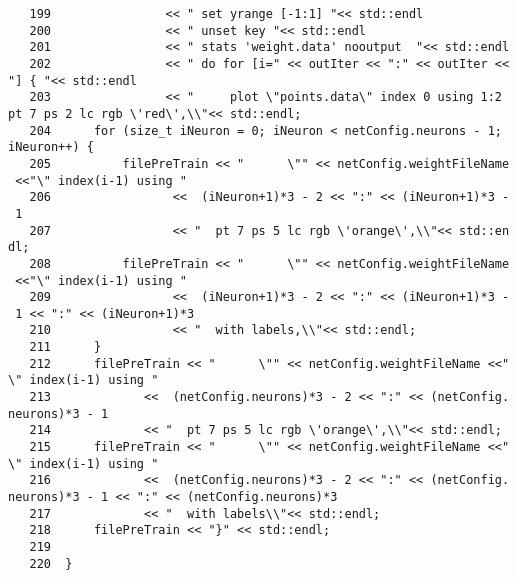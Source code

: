 \begin{verbatim}
   199                << " set yrange [-1:1] "<< std::endl
   200                << " unset key "<< std::endl              
   201                << " stats 'weight.data' nooutput  "<< std::endl
   202                << " do for [i=" << outIter << ":" << outIter <<
"] { "<< std::endl
   203                << "     plot \"points.data\" index 0 using 1:2 
pt 7 ps 2 lc rgb \'red\',\\"<< std::endl;
   204      for (size_t iNeuron = 0; iNeuron < netConfig.neurons - 1; 
iNeuron++) {
   205          filePreTrain << "      \"" << netConfig.weightFileName
 <<"\" index(i-1) using " 
   206                 <<  (iNeuron+1)*3 - 2 << ":" << (iNeuron+1)*3 -
 1
   207                 << "  pt 7 ps 5 lc rgb \'orange\',\\"<< std::en
dl;
   208          filePreTrain << "      \"" << netConfig.weightFileName
 <<"\" index(i-1) using " 
   209                 <<  (iNeuron+1)*3 - 2 << ":" << (iNeuron+1)*3 -
 1 << ":" << (iNeuron+1)*3
   210                 << "  with labels,\\"<< std::endl;
   211      }
   212      filePreTrain << "      \"" << netConfig.weightFileName <<"
\" index(i-1) using " 
   213             <<  (netConfig.neurons)*3 - 2 << ":" << (netConfig.
neurons)*3 - 1
   214             << "  pt 7 ps 5 lc rgb \'orange\',\\"<< std::endl;
   215      filePreTrain << "      \"" << netConfig.weightFileName <<"
\" index(i-1) using " 
   216             <<  (netConfig.neurons)*3 - 2 << ":" << (netConfig.
neurons)*3 - 1 << ":" << (netConfig.neurons)*3
   217             << "  with labels\\"<< std::endl;
   218      filePreTrain << "}" << std::endl;
   219
   220  }
\end{verbatim}
